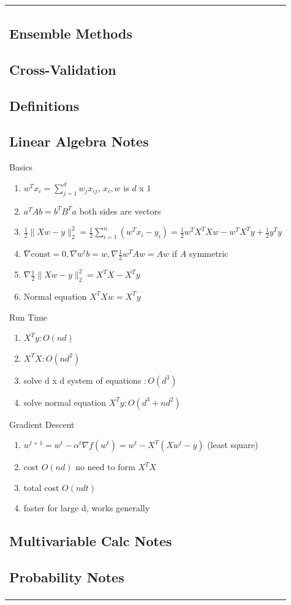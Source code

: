 \documentclass[1pt,letter]{article}
\def\half{\frac 1 2}
\begin{document}
\begin{minipage}{0.45\textwidth}
\begin{tabular}{|p{\textwidth}}
    \subsection{Ensemble Methods}
    \subsection{Cross-Validation}
    \subsection{Definitions}
    \subsection{Linear Algebra Notes}
    Basics
\begin{enumerate}
    \item $w^T x_i = \sum_{j=1}^d w_j x_{ij}$,  $x_i, w$ is $d$ x $1$  
    \item $a^T A b = b^T B^T a$ both sides are vectors
    \item $\half\|Xw-y\|^2_2 = \half \sum_{i=1}^n (w^T x_i -y_i) = \half w^T X^T X w -w^TX^Ty + \half y^Ty$
    \item $\nabla \text{const} = 0, \nabla w^t b = w, \nabla \half w^T A w = Aw$ if $A$ symmetric
    \item $\nabla \half\|Xw-y\|^2_2 = X^T X -X^Ty$ 
    \item Normal equation $X^T Xw =X^Ty$
\end{enumerate}
Run Time
\begin{enumerate}
    \item $X^Ty: O(nd)$
    \item $X^TX: O(nd^2)$
    \item solve d x d system of equations $: O(d^3)$
    \item solve normal equation $X^Ty: O(d^3 + nd^2)$
\end{enumerate}
Gradient Descent
\begin{enumerate}
    \item $w^{t+1} = w^t - \alpha^t \nabla f(w^t) = w^t -  X^T(Xw^t-y)$ (least square)
    \item cost $O(nd)$ no need to form $X^TX$
    \item total cost $O(ndt)$
    \item faster for large d, works generally
\end{enumerate}


    \subsection{Multivariable Calc Notes}
    \subsection{Probability Notes}
\end{tabular}
\end{minipage}
\end{document}
